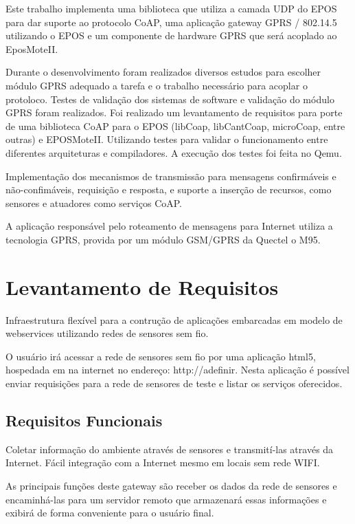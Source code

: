 Este trabalho implementa uma biblioteca que utiliza a camada UDP do EPOS para dar suporte ao protocolo CoAP, uma aplica\c{c}\~ao gateway GPRS / 802.14.5 utilizando o EPOS e um componente de hardware GPRS que ser\'a acoplado ao EposMoteII.

Durante o desenvolvimento foram realizados diversos estudos para escolher m\'odulo GPRS adequado a tarefa e o trabalho necess\'ario para acoplar o protoloco. Testes de valida\c{c}\~ao dos sistemas de software e valida\c{c}\~ao do m\'odulo GPRS foram realizados. Foi realizado um levantamento de requisitos para porte de uma biblioteca CoAP para o EPOS (libCoap, libCantCoap, microCoap, entre outras) e EPOSMoteII. Utilizando testes para validar o funcionamento entre diferentes arquiteturas e compiladores. A execu\c{c}\~ao dos testes foi feita no Qemu.

Implementa\c{c}\~ao dos mecanismos de transmiss\~ao para mensagens confirm\'aveis e n\~ao-confim\'aveis, requisi\c{c}\~ao e resposta, e suporte a inser\c{c}\~ao de recursos, como sensores e atuadores como servi\c{c}os CoAP.

A aplica\c{c}\~ao respons\'avel pelo roteamento de mensagens para Internet utiliza a tecnologia GPRS, provida por um m\'odulo GSM/GPRS da Quectel o M95.

\section{Levantamento de Requisitos}
Infraestrutura flex\'ivel para a contru\c{c}\~ao de aplica\c{c}\~oes embarcadas em modelo de webservices utilizando redes de sensores sem fio.

O usu\'ario ir\'a acessar a rede de sensores sem fio por uma aplica\c{c}\~ao html5, hospedada em na internet no endere\c{c}o: http://adefinir. Nesta aplica\c{c}\~ao \'e poss\'ivel enviar requisi\c{c}\~oes para a rede de sensores de teste e listar os servi\c{c}os oferecidos.

\subsection{Requisitos Funcionais}
Coletar informa\c{c}\~ao do ambiente atrav\'es de sensores e transmit\'i-las atrav\'es da Internet. F\'acil integra\c{c}\~ao com a Internet mesmo em locais sem rede WIFI.

As principais fun\c{c}\~oes deste gateway s\~ao receber os dados da rede de sensores e encaminh\'a-las para um servidor remoto que armazenar\'a essas informa\c{c}\~oes e exibir\'a de forma conveniente para o usu\'ario final.

